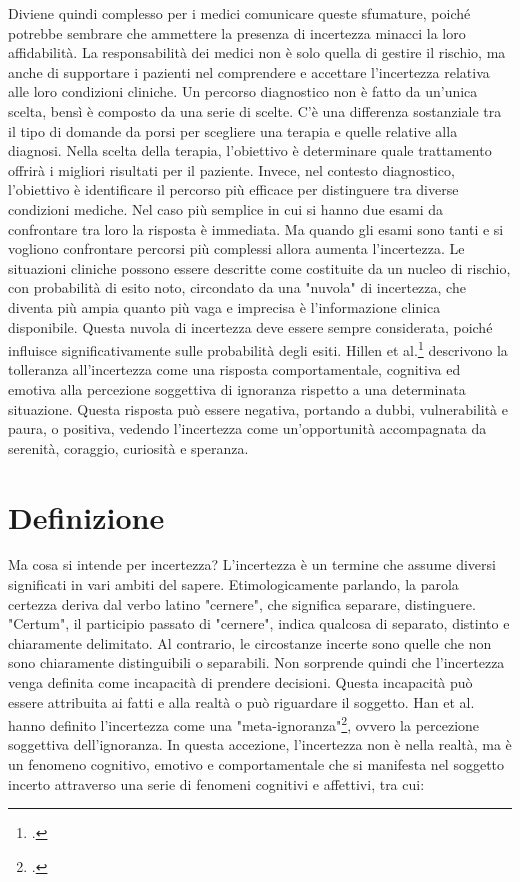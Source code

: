 Diviene quindi complesso per i medici comunicare queste sfumature, poiché potrebbe sembrare che ammettere la presenza di incertezza minacci la loro affidabilità. La responsabilità dei medici non è solo quella di gestire il rischio, ma anche di supportare i pazienti nel comprendere e accettare l'incertezza relativa alle loro condizioni cliniche. 
Un percorso diagnostico non è fatto da un'unica scelta, bensì è composto da una serie di scelte. C'è una differenza sostanziale tra il tipo di domande da porsi per scegliere una terapia e quelle relative alla diagnosi. Nella scelta della terapia, l'obiettivo è determinare quale trattamento offrirà i migliori risultati per il paziente. Invece, nel contesto diagnostico, l'obiettivo è identificare il percorso più efficace per distinguere tra diverse condizioni mediche.
Nel caso più semplice in cui si hanno due esami da confrontare tra loro la risposta è immediata. Ma quando gli esami sono tanti e si vogliono confrontare percorsi più complessi allora aumenta l'incertezza. 
Le situazioni cliniche possono essere descritte come costituite da un nucleo di rischio, con probabilità di esito noto, circondato da una "nuvola" di incertezza, che diventa più ampia quanto più vaga e imprecisa è l'informazione clinica disponibile. Questa nuvola di incertezza deve essere sempre considerata, poiché influisce significativamente sulle probabilità degli esiti.
Hillen et al.\footcite{womak:tolleranza-incertezza} descrivono la tolleranza all'incertezza come una risposta comportamentale, cognitiva ed emotiva alla percezione soggettiva di ignoranza rispetto a una determinata situazione. Questa risposta può essere negativa, portando a dubbi, vulnerabilità e paura, o positiva, vedendo l'incertezza come un'opportunità accompagnata da serenità, coraggio, curiosità e speranza.


\section{Definizione}

Ma cosa si intende per incertezza? L'incertezza è un termine che assume diversi significati in vari ambiti del sapere. Etimologicamente parlando, la parola certezza deriva dal verbo latino "cernere", che significa separare, distinguere. "Certum", il participio passato di "cernere", indica qualcosa di separato, distinto e chiaramente delimitato. Al contrario, le circostanze incerte sono quelle che non sono chiaramente distinguibili o separabili. Non sorprende quindi che l'incertezza venga definita come incapacità di prendere decisioni. Questa incapacità può essere attribuita ai fatti e alla realtà o può riguardare il soggetto. Han et al. hanno definito l'incertezza come una "meta-ignoranza"\footcite{womak:meta-ignoranza}, ovvero la percezione soggettiva dell'ignoranza. In questa accezione, l'incertezza non è nella realtà, ma è un fenomeno cognitivo, emotivo e comportamentale che si manifesta nel soggetto incerto attraverso una serie di fenomeni cognitivi e affettivi, tra cui:

